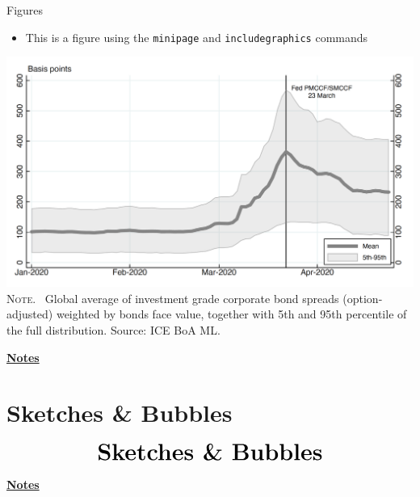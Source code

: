 \documentclass[10pt]{beamer}
\begin{document}
\begin{frame}
    {Figures}
    \begin{itemize}
        \item This is a figure using the \texttt{minipage} and \texttt{includegraphics} commands
    \end{itemize}
    \begin{center}
        \begin{minipage}[b]{.6\textwidth}
            \includegraphics[width=\textwidth]{figure}\\
            \tiny{{\scshape Note}. \ Global average of investment grade corporate bond spreads (option-adjusted) weighted by bonds face value, together with 5th and 95th percentile of the full distribution. Source: ICE BoA ML.}
        \end{minipage}
    \end{center}
\end{frame}
\begin{flushleft}
    \underline{\textbf{Notes}}\setlength{\parskip}{.15cm}\notesize\newline\par
\end{flushleft}


\section{Sketches \& Bubbles}
\begin{frame}
    \begin{eqnarray*}
        &\text{{\huge \textbf{Sketches \& Bubbles}}}\\
    \end{eqnarray*}
\end{frame}
\begin{flushleft}
    \underline{\textbf{Notes}}\setlength{\parskip}{.15cm}\notesize\newline\par
\end{flushleft}
\end{document}
